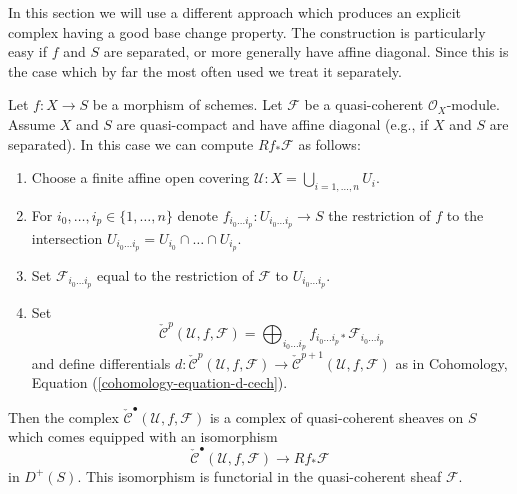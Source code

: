 \medskip\noindent
In this section we will use a different approach which produces an
explicit complex having a good base change property. The construction
is particularly easy if $f$ and $S$ are separated, or more generally
have affine diagonal. Since this is the case which
by far the most often used we treat it separately.

\begin{lemma}
\label{lemma-separated-case-relative-cech}
Let $f : X \to S$ be a morphism of schemes.
Let $\mathcal{F}$ be a quasi-coherent $\mathcal{O}_X$-module.
Assume $X$ and $S$ are quasi-compact and have affine diagonal
(e.g., if $X$ and $S$ are separated).
In this case we can compute $Rf_*\mathcal{F}$ as follows:
\begin{enumerate}
\item Choose a finite affine open covering
$\mathcal{U} : X = \bigcup_{i = 1, \ldots, n} U_i$.
\item For $i_0, \ldots, i_p \in \{1, \ldots, n\}$ denote
$f_{i_0 \ldots i_p} : U_{i_0 \ldots i_p} \to S$ the restriction of $f$
to the intersection $U_{i_0 \ldots i_p} = U_{i_0} \cap \ldots \cap U_{i_p}$.
\item Set $\mathcal{F}_{i_0 \ldots i_p}$ equal to the restriction
of $\mathcal{F}$ to $U_{i_0 \ldots i_p}$.
\item Set
$$
\check{\mathcal{C}}^p(\mathcal{U}, f, \mathcal{F}) =
\bigoplus\nolimits_{i_0 \ldots i_p}
f_{i_0 \ldots i_p *} \mathcal{F}_{i_0 \ldots i_p}
$$
and define differentials
$d : \check{\mathcal{C}}^p(\mathcal{U}, f, \mathcal{F})
\to \check{\mathcal{C}}^{p + 1}(\mathcal{U}, f, \mathcal{F})$
as in Cohomology, Equation (\ref{cohomology-equation-d-cech}).
\end{enumerate}
Then the complex $\check{\mathcal{C}}^\bullet(\mathcal{U}, f, \mathcal{F})$
is a complex of quasi-coherent sheaves on $S$ which comes equipped with an
isomorphism
$$
\check{\mathcal{C}}^\bullet(\mathcal{U}, f, \mathcal{F})
\longrightarrow
Rf_*\mathcal{F}
$$
in $D^{+}(S)$. This isomorphism is functorial in the quasi-coherent
sheaf $\mathcal{F}$.
\end{lemma}

